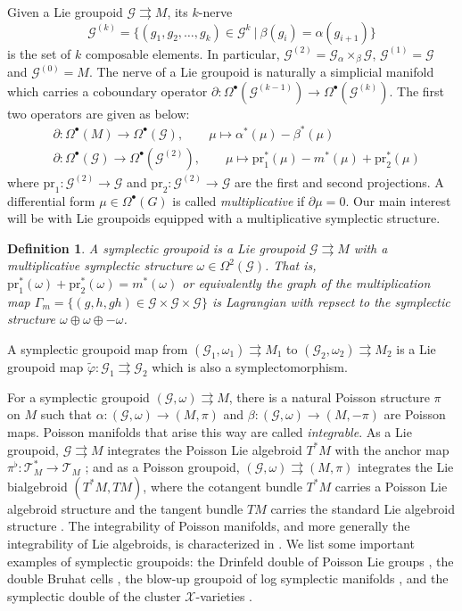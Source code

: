 \documentclass{amsart}
\newtheorem{definition}[theorem]{Definition}
\numberwithin{equation}{section}
\newcommand{\cG}{\mathcal{G}}
\newcommand{\cX}{\mathcal{X}}
\newcommand{\cT}{\mathcal{T}}
\newcommand{\rra}{\rightrightarrows}
\begin{document}
Given a Lie groupoid $\cG \rra M$, its $k$-nerve 
\[
	\cG^{(k)} = \{(g_1, g_2, \ldots, g_k) \in \cG^k ~|~ \beta(g_i) = \alpha(g_{i+1})\}
\]
is the set of $k$ composable elements. In particular, $\cG^{(2)} = \cG {_\alpha \times_\beta} \cG$, $\cG^{(1)} = \cG$ and $\cG^{(0)} = M$. The nerve of a Lie groupoid is naturally a simplicial manifold which carries a coboundary operator $\partial: \Omega^\bullet(\cG^{(k-1)}) \to \Omega^\bullet(\cG^{(k)})$. The first two operators are given as below:
\begin{align} \label{eq:gpdcob}
	& \partial: \Omega^\bullet(M) \to \Omega^\bullet(\cG), \qquad \mu \mapsto \alpha^*(\mu) - \beta^*(\mu) \\
	& \partial: \Omega^\bullet(\cG) \to \Omega^\bullet(\cG^{(2)}), \qquad \mu \mapsto \mathrm{pr}_1^*(\mu) - m^*(\mu) + \mathrm{pr}_2^*(\mu)
\end{align}
where $\mathrm{pr}_1: \cG^{(2)} \to \cG$ and $\mathrm{pr}_2: \cG^{(2)} \to \cG$ are the first and second projections. A differential form $\mu \in \Omega^\bullet(G)$ is called \emph{multiplicative} if $\partial \mu = 0$. Our main interest will be with Lie groupoids equipped with a multiplicative symplectic structure.
\begin{definition}
  A \emph{symplectic groupoid} is a Lie groupoid $\cG \rra M$ with a multiplicative symplectic structure $\omega \in \Omega^2(\cG)$.
  That is, $\mathrm{pr}_1^*(\omega)+\mathrm{pr}_2^*(\omega) = m^*(\omega)$ or equivalently the graph of the multiplication map $\Gamma_m = \{(g, h, gh) \in \cG \times \cG \times \cG\}$ is Lagrangian with repsect to the symplectic structure $\omega \oplus \omega \oplus -\omega$.
\end{definition}

A symplectic groupoid map from $(\cG_1, \omega_1) \rra M_1$ to $(\cG_2, \omega_2) \rra M_2$ is a Lie groupoid map $\tilde{\varphi}: \cG_1 \rra \cG_2$ which is also a symplectomorphism.

For a symplectic groupoid $(\cG, \omega) \rra M$, there is a natural Poisson structure $\pi$ on $M$ such that $\alpha: (\cG, \omega) \to (M, \pi)$ and $\beta: (\cG, \omega) \to (M, -\pi)$ are Poisson maps.
Poisson manifolds that arise this way are called \emph{integrable}.
As a Lie groupoid, $\cG \rra M$ integrates the Poisson Lie algebroid $T^*M$ with the anchor map $\pi^\flat: \cT^*_M \to \cT_M$ \cite{MR866024}; and as a Poisson groupoid, $(\cG, \omega) \rra (M, \pi)$ integrates the Lie bialgebroid $(T^*M, TM)$, where the cotangent bundle $T^*M$ carries a Poisson Lie algebroid structure and the tangent bundle $TM$ carries the standard Lie algebroid structure \cite{MR1262213}.
The integrability of Poisson manifolds, and more generally the integrability of Lie algebroids, is characterized in \cite{MR1973056, MR2128714}.
We list some important examples of symplectic groupoids: the Drinfeld double of Poisson Lie groups \cite{MR1054741}, the double Bruhat cells \cite{LuM16}, the blow-up groupoid of log symplectic manifolds \cite{MR3214314}, and the symplectic double of the cluster $\cX$-varieties \cite{MR2470108}.
\end{document}
